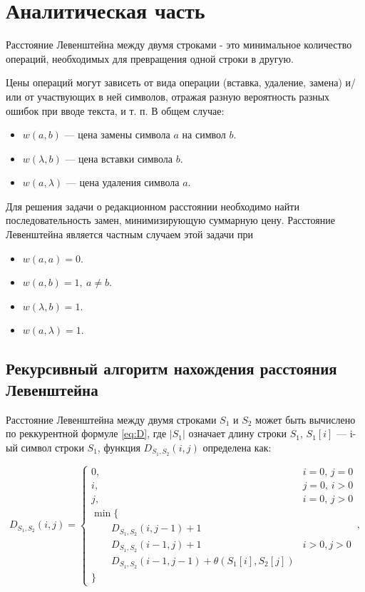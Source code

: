 \chapter{Аналитическая часть}

Расстояние Левенштейна между двумя строками - это минимальное количество операций, необходимых для превращения одной строки в другую.

Цены операций могут зависеть от вида операции (вставка, удаление, замена) и/или от участвующих в ней символов, отражая разную вероятность разных ошибок при вводе текста, и т. п. В общем случае:

\begin{itemize}
	\item $w(a,b)$ — цена замены символа $a$ на символ $b$.
	\item $w(\lambda,b)$ — цена вставки символа $b$.
	\item $w(a,\lambda)$ — цена удаления символа $a$.
\end{itemize}

Для решения задачи о редакционном расстоянии необходимо найти последовательность замен, минимизирующую суммарную цену. Расстояние Левенштейна является частным случаем этой задачи при

\begin{itemize}
	\item $w(a,a)=0$.
	\item $w(a,b)=1, \medspace a \neq b$.
	\item $w(\lambda,b)=1$.
	\item $w(a,\lambda)=1$.
\end{itemize}

\section{Рекурсивный алгоритм нахождения расстояния Левенштейна}

Расстояние Левенштейна между двумя строками $S_1$ и $S_2$ может быть вычислено по реккурентной формуле \ref{eq:D}, где $|S_1|$ означает длину строки $S_1$, $S_1[i]$ — i-ый символ строки $S_1$, функция $D_{S_1, S_2}(i, j)$ определена как:

\begin{equation}
\label{eq:D}
D_{S_1, S_2}(i, j) = \begin{cases}
0, &\text{$i = 0$, $j = 0$}\\
i, &\text{$j = 0$, $i > 0$}\\
j, &\text{$i = 0$, $j > 0$}\\
\min \lbrace\\
\qquad D_{S_1, S_2}(i, j-1) + 1\\
\qquad D_{S_1, S_2}(i-1, j) + 1 &\text{$i > 0, j > 0$}\\
\qquad D_{S_1, S_2}(i-1, j-1) + \theta(S_1[i], S_2[j])\\
\rbrace
\end{cases},
\end{equation}

